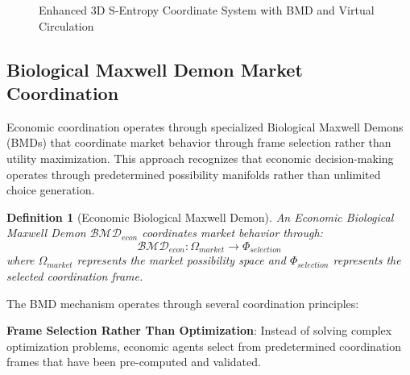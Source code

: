 \documentclass[12pt,a4paper]{article}
\newtheorem{definition}[theorem]{Definition}
\begin{document}
\begin{figure}[H]
\caption{Enhanced 3D S-Entropy Coordinate System with BMD and Virtual Circulation}
\label{fig:s_entropy_3d_system}
\end{figure}

\subsection{Biological Maxwell Demon Market Coordination}

Economic coordination operates through specialized Biological Maxwell Demons (BMDs) that coordinate market behavior through frame selection rather than utility maximization. This approach recognizes that economic decision-making operates through predetermined possibility manifolds rather than unlimited choice generation.

\begin{definition}[Economic Biological Maxwell Demon]
An Economic Biological Maxwell Demon $\mathcal{BMD}_{econ}$ coordinates market behavior through:
\begin{equation}
\mathcal{BMD}_{econ}: \Omega_{market} \rightarrow \Phi_{selection}
\end{equation}
where $\Omega_{market}$ represents the market possibility space and $\Phi_{selection}$ represents the selected coordination frame.
\end{definition}

The BMD mechanism operates through several coordination principles:

\textbf{Frame Selection Rather Than Optimization}: Instead of solving complex optimization problems, economic agents select from predetermined coordination frames that have been pre-computed and validated.
\end{document}
